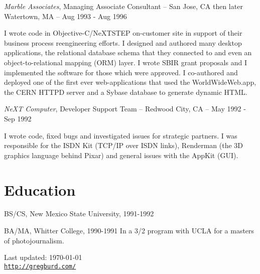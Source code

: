 \documentclass[letterpaper]{article}
\def\footerlink{http://gregburd.com/}
\renewenvironment{itemize}{
  \begin{list}{}{
    \setlength{\leftmargin}{1.5em}
  }
}{
  \end{list}
}
\begin{document}
\begin{itemize}
\item {\it Marble Associates}, Managing Associate Consultant -- San Jose, CA then later Watertown, MA -- Aug 1993 - Aug 1996

\begin{itemize}
\item I wrote code in Objective-C/NeXTSTEP on-customer site in support of their
  business process reengineering efforts. I designed and authored many desktop
  applications, the relational database schema that they connected to and even
  an object-to-relational mapping (ORM) layer.  I wrote SBIR grant proposals
  and I implemented the software for those which were approved.  I co-authored
  and deployed one of the first ever web-applications that used the
  WorldWideWeb.app, the CERN HTTPD server and a Sybase database to generate
  dynamic HTML.
\end{itemize}

\item {\it NeXT Computer}, Developer Support Team -- Redwood City, CA -- May 1992 - Sep 1992

\begin{itemize}
\item I wrote code, fixed bugs and investigated issues for strategic partners.
  I was responsible for the ISDN Kit (TCP/IP over ISDN links), Renderman (the
  3D graphics language behind Pixar) and general issues with the AppKit (GUI).
\end{itemize}

\end{itemize}


\section*{Education}

\begin{itemize}
  \item BS/CS, New Mexico State University, 1991-1992

  \item BA/MA, Whitter College, 1990-1991
    In a 3/2 program with UCLA for a masters of photojournalism.
\end{itemize}

\bigskip

\begin{center}
  \begin{footnotesize}
    Last updated: \today \\
    \href{\footerlink}{\texttt{\footerlink}}
  \end{footnotesize}
\end{center}
\end{document}
